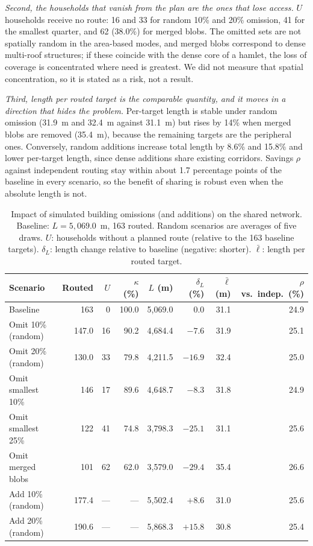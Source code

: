 \documentclass[journal]{IEEEtran}
\begin{document}
\emph{Second, the households that vanish from the plan are the ones that lose access.} $U$ households receive no route: 16 and 33 for random 10\% and 20\% omission, 41 for the smallest quarter, and 62 (38.0\%) for merged blobs. The omitted sets are not spatially random in the area-based modes, and merged blobs correspond to dense multi-roof structures; if these coincide with the dense core of a hamlet, the loss of coverage is concentrated where need is greatest. We did not measure that spatial concentration, so it is stated as a risk, not a result.

\emph{Third, length per routed target is the comparable quantity, and it moves in a direction that hides the problem.} Per-target length is stable under random omission (31.9~m and 32.4~m against 31.1~m) but rises by 14\% when merged blobs are removed (35.4~m), because the remaining targets are the peripheral ones. Conversely, random additions increase total length by 8.6\% and 15.8\% and lower per-target length, since dense additions share existing corridors. Savings $\rho$ against independent routing stay within about 1.7 percentage points of the baseline in every scenario, so the benefit of sharing is robust even when the absolute length is not.

\begin{table}[t]
\centering
\caption{Impact of simulated building omissions (and additions) on the shared network. Baseline: $L=5{,}069.0$~m, 163 routed. Random scenarios are averages of five draws. $U$: households without a planned route (relative to the 163 baseline targets). $\delta_L$: length change relative to baseline (negative: shorter). $\bar\ell$: length per routed target.}
\label{tab:omission}
\small
\begin{tabular}{@{}lrrrrrrr@{}}
\toprule
Scenario & Routed & $U$ & $\kappa$ (\%) & $L$ (m) & $\delta_L$ (\%) & $\bar\ell$ (m) & $\rho$ vs.\ indep.\ (\%)\\
\midrule
Baseline & 163 & 0 & 100.0 & 5{,}069.0 & 0.0 & 31.1 & 24.9\\
Omit 10\% (random) & 147.0 & 16 & 90.2 & 4{,}684.4 & $-7.6$ & 31.9 & 25.1\\
Omit 20\% (random) & 130.0 & 33 & 79.8 & 4{,}211.5 & $-16.9$ & 32.4 & 25.0\\
Omit smallest 10\% & 146 & 17 & 89.6 & 4{,}648.7 & $-8.3$ & 31.8 & 24.9\\
Omit smallest 25\% & 122 & 41 & 74.8 & 3{,}798.3 & $-25.1$ & 31.1 & 25.6\\
Omit merged blobs & 101 & 62 & 62.0 & 3{,}579.0 & $-29.4$ & 35.4 & 26.6\\
\midrule
Add 10\% (random) & 177.4 & --- & --- & 5{,}502.4 & $+8.6$ & 31.0 & 25.6\\
Add 20\% (random) & 190.6 & --- & --- & 5{,}868.3 & $+15.8$ & 30.8 & 25.4\\
\bottomrule
\end{tabular}
\end{table}
\end{document}
